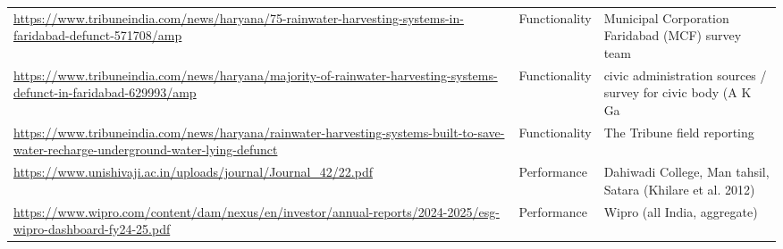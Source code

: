 {\begin{longtable}{p{9.2cm} p{2.5cm} p{4.2cm}}
\url{https://www.tribuneindia.com/news/haryana/75-rainwater-harvesting-systems-in-faridabad-defunct-571708/amp} & Functionality & Municipal Corporation Faridabad (MCF) survey team\\
\url{https://www.tribuneindia.com/news/haryana/majority-of-rainwater-harvesting-systems-defunct-in-faridabad-629993/amp} & Functionality & civic administration sources / survey for civic body (A K Ga\\
\url{https://www.tribuneindia.com/news/haryana/rainwater-harvesting-systems-built-to-save-water-recharge-underground-water-lying-defunct} & Functionality & The Tribune field reporting\\
\url{https://www.unishivaji.ac.in/uploads/journal/Journal_42/22.pdf} & Performance & Dahiwadi College, Man tahsil, Satara (Khilare et al. 2012)\\
\url{https://www.wipro.com/content/dam/nexus/en/investor/annual-reports/2024-2025/esg-wipro-dashboard-fy24-25.pdf} & Performance & Wipro (all India, aggregate)\\
\end{longtable}}
